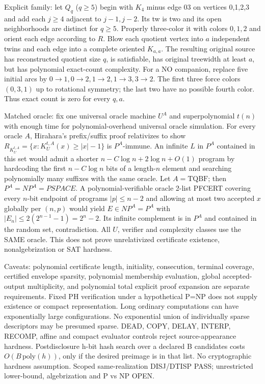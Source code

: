\documentclass[11pt]{article}
\begin{document}
Explicit family: let $Q_q$ ($q\ge5$) begin with $K_4$ minus edge 03 on vertices 0,1,2,3 and add each $j\ge4$ adjacent to $j-1,j-2$. Its tw is two and its open neighborhoods are distinct for $q\ge5$. Properly three-color it with colors $0,1,2$ and orient each edge according to $R$. Blow each quotient vertex into $a$ independent twins and each edge into a complete oriented $K_{a,a}$. The resulting original source has reconstructed quotient size $q$, is satisfiable, has original treewidth at least $a$, but has polynomial exact-count complexity. For a NO companion, replace five initial arcs by $0\to1,0\to2,1\to2,1\to3,3\to2$. The first three force colors $(0,3,1)$ up to rotational symmetry; the last two have no possible fourth color. Thus exact count is zero for every $q,a$.

Matched oracle: fix one universal oracle machine $U^A$ and superpolynomial $t(n)$ with enough time for polynomial-overhead universal oracle simulation. For every oracle $A$, Hirahara's prefix/suffix proof relativizes to show $R_{K_U^{t,A}}=\{x:K_U^{t,A}(x)\ge |x|-1\}$ is $P^A$-immune. An infinite $L$ in $P^A$ contained in this set would admit a shorter $n-C\log n+2\log n+O(1)$ program by hardcoding the first $n-C\log n$ bits of a length-$n$ element and searching polynomially many suffixes with the same oracle. Let $A=\mathrm{TQBF}$; then $P^A=NP^A=PSPACE$. A polynomial-verifiable oracle 2-list PFCERT covering every $n$-bit endpoint of programs $|p|\le n-2$ and allowing at most two accepted $x$ globally per $(n,p)$ would yield $E\in NP^A=P^A$ with $|E_n|\le2(2^{n-1}-1)=2^n-2$. Its infinite complement is in $P^A$ and contained in the random set, contradiction. All $U$, verifier and complexity classes use the SAME oracle. This does not prove unrelativized certificate existence, nonalgebrization or SAT hardness.

Caveats: polynomial certificate length, initiality, consecution, terminal coverage, certified envelope sparsity, polynomial membership evaluation, global accepted-output multiplicity, and polynomial total explicit proof expansion are separate requirements. Fixed PH verification under a hypothetical P=NP does not supply existence or compact representation. Long ordinary computations can have exponentially large configurations. No exponential union of individually sparse descriptors may be presumed sparse. DEAD, COPY, DELAY, INTERP, RECOMP, affine and compact evaluator controls reject source-appearance hardness. Postdisclosure h-bit hash search over a declared B candidates costs $O(B\,\mathrm{poly}(h))$, only if the desired preimage is in that list. No cryptographic hardness assumption. Scoped same-realization DISJ/DTISP PASS; unrestricted lower-bound, algebrization and P vs NP OPEN.
\end{document}
